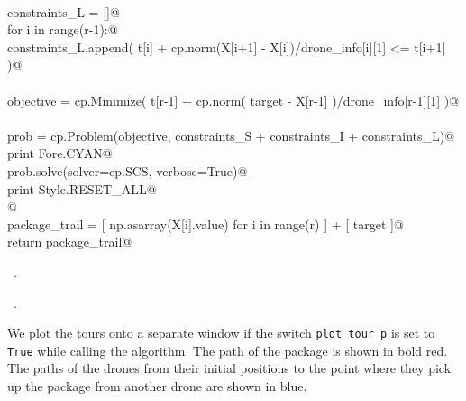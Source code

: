 \documentclass[12.0pt]{report}
\begin{document}
\begin{flushleft}
\begin{minipage}{\linewidth}
\begin{list}{}{}
\mbox{}\verb@@\\
\mbox{}\verb@    constraints_L = []@\\
\mbox{}\verb@    for i in range(r-1):@\\
\mbox{}\verb@         constraints_L.append( t[i] + cp.norm(X[i+1] - X[i])/drone_info[i][1] <= t[i+1] )@\\
\mbox{}\verb@@\\
\mbox{}\verb@    objective = cp.Minimize(  t[r-1]  + cp.norm( target - X[r-1]  )/drone_info[r-1][1]  )@\\
\mbox{}\verb@@\\
\mbox{}\verb@    prob = cp.Problem(objective, constraints_S + constraints_I + constraints_L)@\\
\mbox{}\verb@    print Fore.CYAN@\\
\mbox{}\verb@    prob.solve(solver=cp.SCS, verbose=True)@\\
\mbox{}\verb@    print Style.RESET_ALL@\\
\mbox{}\verb@    @\\
\mbox{}\verb@    package_trail = [ np.asarray(X[i].value) for i in range(r) ] + [ target ]@\\
\mbox{}\verb@    return package_trail@\\
\mbox{}\verb@@{\NWsep}
\end{list}
\vspace{-1.5ex}
\footnotesize
\begin{list}{}{\setlength{\itemsep}{-\parsep}\setlength{\itemindent}{-\leftmargin}}
\item \NWtxtMacroDefBy\ .
\item \NWtxtMacroRefIn\ .

\item{}
\end{list}
\end{minipage}\vspace{4ex}
\end{flushleft}


We plot the tours onto a separate window if the switch \verb|plot_tour_p| is set to \verb|True| while calling the algorithm. 
The path of the package is shown in bold red. The paths of the drones from their initial positions to the point where they pick 
up the package from another drone are shown in blue.
\end{document}
